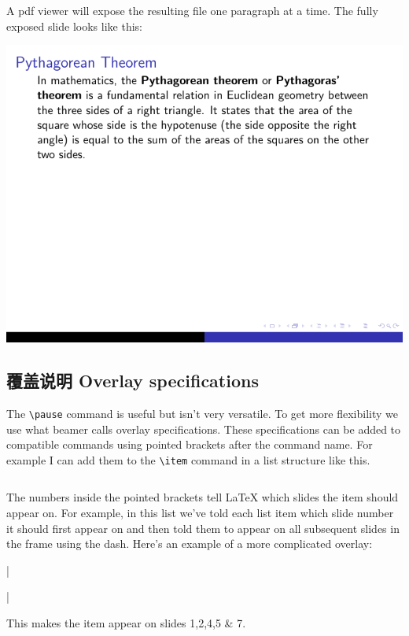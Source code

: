 \begin{column}{0.5\textwidth}
\inputminted[linenos=true]{latex}{examples/beamer/overlay-pause2.tex}

A pdf viewer will expose the resulting file one paragraph at a time. The fully exposed slide looks like this:

\includegraphics[page=4]{examples/beamer/overlay-pause2.pdf}

\subsection{覆盖说明 Overlay specifications}

The \verb|\pause| command is useful but isn't very versatile. To get more flexibility we use what beamer calls overlay specifications. These specifications can be added to compatible commands using pointed brackets after the command name. For example I can add them to the \verb|\item| command in a list structure like this.

\inputminted[linenos=true]{latex}{examples/beamer/overlay-list.tex}

The numbers inside the pointed brackets tell LaTeX which slides the item should appear on. For example, in this list we've told each list item which slide number it should first appear on and then told them to appear on all subsequent slides in the frame using the dash. Here's an example of a more complicated overlay:

|\item<-2,4-5,7>|

This makes the item appear on slides 1,2,4,5 \& 7.


\end{column}

